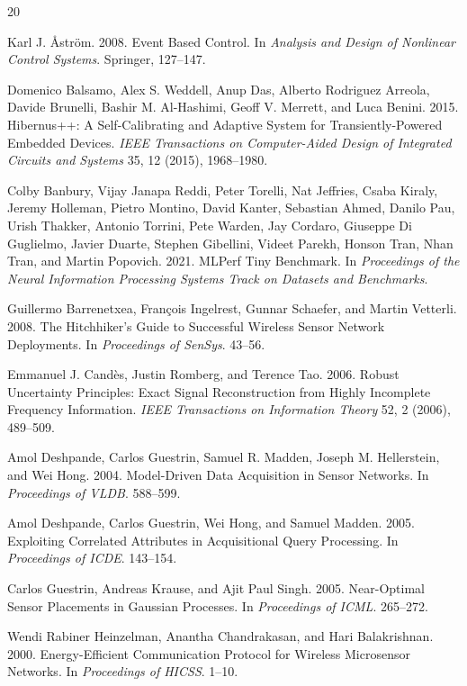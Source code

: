 \begin{thebibliography}{20}

Karl J. \r{A}str\"om.
2008.
Event Based Control.
In \emph{Analysis and Design of Nonlinear Control Systems}.
Springer, 127--147.

Domenico Balsamo, Alex S. Weddell, Anup Das, Alberto Rodriguez Arreola,
Davide Brunelli, Bashir M. Al-Hashimi, Geoff V. Merrett, and Luca Benini.
2015.
Hibernus++: A Self-Calibrating and Adaptive System for Transiently-Powered
Embedded Devices.
\emph{IEEE Transactions on Computer-Aided Design of Integrated Circuits and
Systems} 35, 12 (2015), 1968--1980.

Colby Banbury, Vijay Janapa Reddi, Peter Torelli, Nat Jeffries, Csaba Kiraly,
Jeremy Holleman, Pietro Montino, David Kanter, Sebastian Ahmed, Danilo Pau,
Urish Thakker, Antonio Torrini, Pete Warden, Jay Cordaro, Giuseppe Di Guglielmo,
Javier Duarte, Stephen Gibellini, Videet Parekh, Honson Tran, Nhan Tran, and
Martin Popovich.
2021.
MLPerf Tiny Benchmark.
In \emph{Proceedings of the Neural Information Processing Systems Track on
Datasets and Benchmarks}.

Guillermo Barrenetxea, Fran\c{c}ois Ingelrest, Gunnar Schaefer, and Martin Vetterli.
2008.
The Hitchhiker's Guide to Successful Wireless Sensor Network Deployments.
In \emph{Proceedings of SenSys}. 43--56.

Emmanuel J. Cand\`es, Justin Romberg, and Terence Tao.
2006.
Robust Uncertainty Principles: Exact Signal Reconstruction from Highly
Incomplete Frequency Information.
\emph{IEEE Transactions on Information Theory} 52, 2 (2006), 489--509.

Amol Deshpande, Carlos Guestrin, Samuel R. Madden, Joseph M. Hellerstein, and
Wei Hong.
2004.
Model-Driven Data Acquisition in Sensor Networks.
In \emph{Proceedings of VLDB}. 588--599.

Amol Deshpande, Carlos Guestrin, Wei Hong, and Samuel Madden.
2005.
Exploiting Correlated Attributes in Acquisitional Query Processing.
In \emph{Proceedings of ICDE}. 143--154.

Carlos Guestrin, Andreas Krause, and Ajit Paul Singh.
2005.
Near-Optimal Sensor Placements in Gaussian Processes.
In \emph{Proceedings of ICML}. 265--272.

Wendi Rabiner Heinzelman, Anantha Chandrakasan, and Hari Balakrishnan.
2000.
Energy-Efficient Communication Protocol for Wireless Microsensor Networks.
In \emph{Proceedings of HICSS}. 1--10.


\end{thebibliography}
